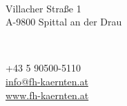 \begin{titlepage}

\begin{minipage}{0.45\textwidth}
\sffamily
\raggedright
\footnotesize
\sodef{}
	 \\
\vspace{0.1cm}
Villacher Straße 1\\
A-9800 Spittal an der Drau\\

\end{minipage}
\raggedleft
\hfill
\begin{minipage}{0.45\textwidth}
\raggedleft
	
\end{minipage}
\vspace{0.1cm}\\
\raggedright
\begin{minipage}{0.65\textwidth}
\sffamily
\raggedright
\footnotesize
+43 5 90500-5110\\
\href{mailto:info@fh-kaernten.at}{info@fh-kaernten.at}\\
\href{http://www.fh-kaernten.at}{www.fh-kaernten.at}\\
\end{minipage}

\vspace{2,95cm}


\end{titlepage}

